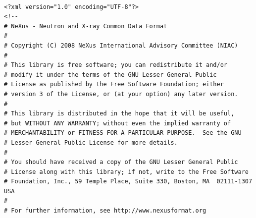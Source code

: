 \documentclass[a4paper]{article}\usepackage[dvips]{graphicx}
\begin{document}
\begin{verbatim}

<?xml version="1.0" encoding="UTF-8"?>
<!--
# NeXus - Neutron and X-ray Common Data Format
# 
# Copyright (C) 2008 NeXus International Advisory Committee (NIAC)
# 
# This library is free software; you can redistribute it and/or
# modify it under the terms of the GNU Lesser General Public
# License as published by the Free Software Foundation; either
# version 3 of the License, or (at your option) any later version.
#
# This library is distributed in the hope that it will be useful,
# but WITHOUT ANY WARRANTY; without even the implied warranty of
# MERCHANTABILITY or FITNESS FOR A PARTICULAR PURPOSE.  See the GNU
# Lesser General Public License for more details.
#
# You should have received a copy of the GNU Lesser General Public
# License along with this library; if not, write to the Free Software
# Foundation, Inc., 59 Temple Place, Suite 330, Boston, MA  02111-1307  USA
#
# For further information, see http://www.nexusformat.org


\end{verbatim}
\end{document}
